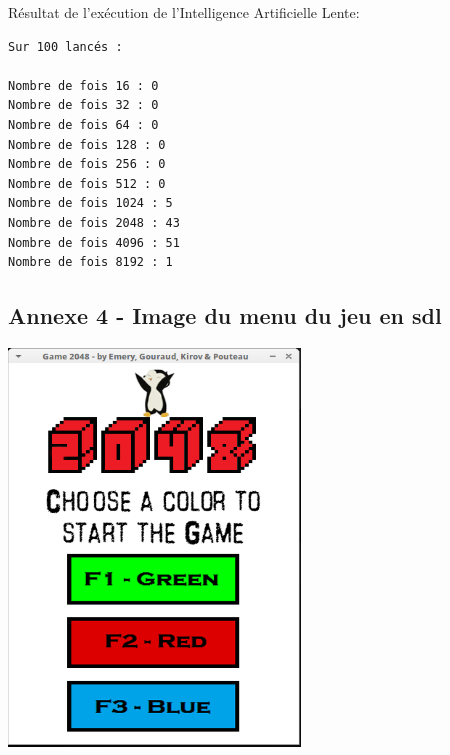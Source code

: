 \documentclass[a4paper]{article}
\begin{document}
\noindent
Résultat de l'exécution de l'Intelligence Artificielle Lente:
\begin{verbatim}
Sur 100 lancés : 

Nombre de fois 16 : 0
Nombre de fois 32 : 0
Nombre de fois 64 : 0
Nombre de fois 128 : 0
Nombre de fois 256 : 0
Nombre de fois 512 : 0
Nombre de fois 1024 : 5
Nombre de fois 2048 : 43
Nombre de fois 4096 : 51
Nombre de fois 8192 : 1
\end{verbatim}

\newpage
\subsection{Annexe 4 - Image du menu du jeu en sdl}
\label{sec-7-4}
\noindent
\includegraphics{jeu-sdl.png}
\end{document}
